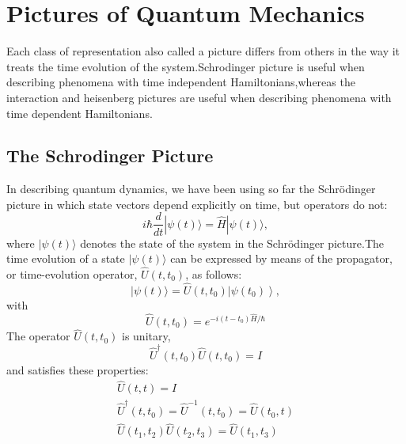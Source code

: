 \section{Pictures of Quantum Mechanics}
Each class of representation also called a picture differs from others in the way it treats the time evolution of the system.Schrodinger picture is useful when describing phenomena with time independent Hamiltonians,whereas the interaction and heisenberg pictures are useful when describing phenomena with time dependent Hamiltonians.
\subsection{The Schrodinger Picture}
In describing quantum dynamics, we have been using so far the Schrödinger picture in which state vectors depend explicitly on time, but operators do not:
$$
i \hbar \frac{d}{d t}|\psi(t)\rangle=\hat{H}|\psi(t)\rangle,
$$
where $|\psi(t)\rangle$ denotes the state of the system in the Schrödinger picture.The  time evolution of a state $|\psi(t)\rangle$ can be expressed by means of the propagator, or time-evolution operator, $\hat{U}\left(t, t_{0}\right)$, as follows:
$$
|\psi(t)\rangle=\hat{U}\left(t, t_{0}\right)\left|\psi\left(t_{0}\right)\right\rangle,
$$
with
$$
\hat{U}\left(t, t_{0}\right)=e^{-i\left(t-t_{0}\right) \hat{H} / \hbar}
$$
The operator $\hat{U}\left(t, t_{0}\right)$ is unitary,
$$
\hat{U}^{\dagger}\left(t, t_{0}\right) \hat{U}\left(t, t_{0}\right)=I
$$
and satisfies these properties:
$$
\begin{gathered}
\hat{U}(t, t)=I \\
\hat{U}^{\dagger}\left(t, t_{0}\right)=\hat{U}^{-1}\left(t, t_{0}\right)=\hat{U}\left(t_{0}, t\right) \\
\hat{U}\left(t_{1}, t_{2}\right) \hat{U}\left(t_{2}, t_{3}\right)=\hat{U}\left(t_{1}, t_{3}\right)
\end{gathered}
$$
